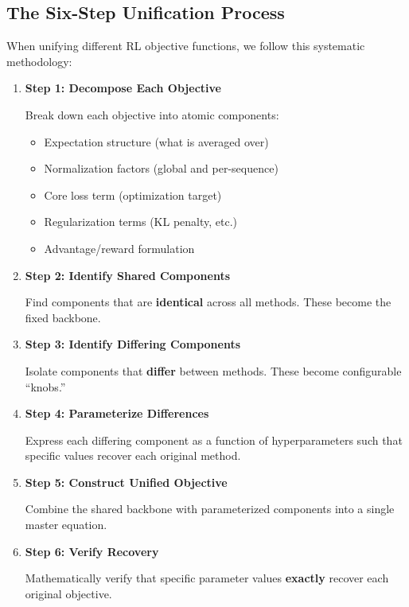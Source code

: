 \documentclass[11pt,a4paper]{article}
\begin{document}
\subsection{The Six-Step Unification Process}

When unifying different RL objective functions, we follow this systematic methodology:

\begin{enumerate}[leftmargin=*]
    \item \textbf{Step 1: Decompose Each Objective}
    
    Break down each objective into atomic components:
    \begin{itemize}
        \item Expectation structure (what is averaged over)
        \item Normalization factors (global and per-sequence)
        \item Core loss term (optimization target)
        \item Regularization terms (KL penalty, etc.)
        \item Advantage/reward formulation
    \end{itemize}
    
    \item \textbf{Step 2: Identify Shared Components}
    
    Find components that are \textbf{identical} across all methods. These become the fixed backbone.
    
    \item \textbf{Step 3: Identify Differing Components}
    
    Isolate components that \textbf{differ} between methods. These become configurable ``knobs.''
    
    \item \textbf{Step 4: Parameterize Differences}
    
    Express each differing component as a function of hyperparameters such that specific values recover each original method.
    
    \item \textbf{Step 5: Construct Unified Objective}
    
    Combine the shared backbone with parameterized components into a single master equation.
    
    \item \textbf{Step 6: Verify Recovery}
    
    Mathematically verify that specific parameter values \textbf{exactly} recover each original objective.
\end{enumerate}
\end{document}

